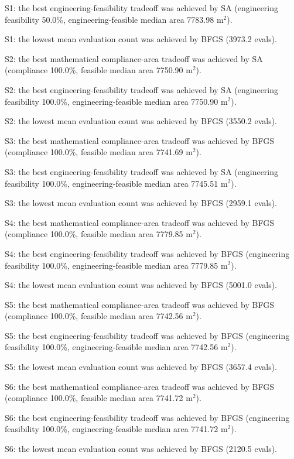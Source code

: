 S1: the best engineering-feasibility tradeoff was achieved by SA (engineering feasibility 50.0\%, engineering-feasible median area 7783.98 m$^2$).

S1: the lowest mean evaluation count was achieved by BFGS (3973.2 evals).

S2: the best mathematical compliance-area tradeoff was achieved by SA (compliance 100.0\%, feasible median area 7750.90 m$^2$).

S2: the best engineering-feasibility tradeoff was achieved by SA (engineering feasibility 100.0\%, engineering-feasible median area 7750.90 m$^2$).

S2: the lowest mean evaluation count was achieved by BFGS (3550.2 evals).

S3: the best mathematical compliance-area tradeoff was achieved by BFGS (compliance 100.0\%, feasible median area 7741.69 m$^2$).

S3: the best engineering-feasibility tradeoff was achieved by SA (engineering feasibility 100.0\%, engineering-feasible median area 7745.51 m$^2$).

S3: the lowest mean evaluation count was achieved by BFGS (2959.1 evals).

S4: the best mathematical compliance-area tradeoff was achieved by BFGS (compliance 100.0\%, feasible median area 7779.85 m$^2$).

S4: the best engineering-feasibility tradeoff was achieved by BFGS (engineering feasibility 100.0\%, engineering-feasible median area 7779.85 m$^2$).

S4: the lowest mean evaluation count was achieved by BFGS (5001.0 evals).

S5: the best mathematical compliance-area tradeoff was achieved by BFGS (compliance 100.0\%, feasible median area 7742.56 m$^2$).

S5: the best engineering-feasibility tradeoff was achieved by BFGS (engineering feasibility 100.0\%, engineering-feasible median area 7742.56 m$^2$).

S5: the lowest mean evaluation count was achieved by BFGS (3657.4 evals).

S6: the best mathematical compliance-area tradeoff was achieved by BFGS (compliance 100.0\%, feasible median area 7741.72 m$^2$).

S6: the best engineering-feasibility tradeoff was achieved by BFGS (engineering feasibility 100.0\%, engineering-feasible median area 7741.72 m$^2$).

S6: the lowest mean evaluation count was achieved by BFGS (2120.5 evals).

